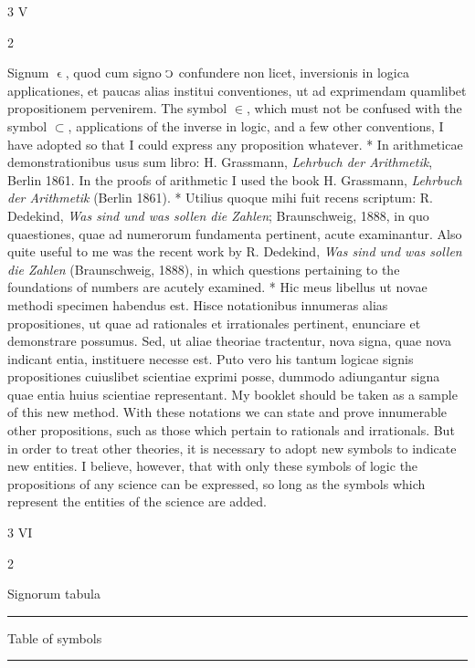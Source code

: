 \documentclass{book}
\newcommand{\s}{\switchcolumn} %
\newcommand{\C}{\mathop{\sbox0{$\displaystyle$$\reflectbox{C}$} %
\raisebox{-\height+\ht0-0.05cm}[\ht0][\dp0]{\scalebox{0.8}[0.8]{\copy0}}}\displaylimits} %
\newcommand{\smallIn}{\ensuremath{\mathrel{\epsilon}}}
\newcommand\peanoHeadingMedium[1]{ \vspace{1cm} {\Large #1} \nopagebreak[4]

  \noindent\rule{1cm}{0.4pt} \nopagebreak[1]}
\newcommand{\peanoPage}[1]{\vspace{1ex}

  \columnratio{0.475, 0.05, 0.475} \begin{paracol}{3} \centering \hdashrule{\columnwidth}{0.1mm}{0.1mm 1mm} \s #1 \s \hdashrule{\columnwidth}{0.1mm}{0.1mm 1mm} \end{paracol}

\vspace{1ex}}
\newenvironment{translateTwoCol}
               { %
                 \columnratio{0.5, 0.5} \begin{paracol}{2}
                 \newcommand{\LAT}{\switchcolumn[0]*}
                 \newcommand{\ENG}{\switchcolumn[1]}
               }
               { %
                 \let\ENG\undefined
                 \let\LAT\undefined
                 \end{paracol}
               }
\begin{document}
\peanoPage{V} %

\begin{translateTwoCol}
Signum $\smallIn$, quod cum signo $\C$ confundere non licet, inversionis in logica applicationes, et paucas alias institui conventiones, ut ad exprimendam quamlibet propositionem pervenirem.
\ENG
The symbol $\in$, which must not be confused with the symbol $\subset$, applications of the inverse in logic, and a few other conventions, I have adopted so that I could express any proposition whatever.
\LAT
In arithmeticae demonstrationibus usus sum libro: H. Grassmann, \emph{Lehrbuch der Arithmetik}, Berlin 1861.
\ENG
In the proofs of arithmetic I used the book H. Grassmann, \emph{Lehrbuch der Arithmetik} (Berlin 1861).
\LAT
Utilius quoque mihi fuit recens scriptum: R. Dedekind, \emph{Was sind und was sollen die Zahlen}; Braunschweig, 1888, in quo quaestiones, quae ad numerorum fundamenta pertinent, acute examinantur.
\ENG
Also quite useful to me was the recent work by R. Dedekind, \emph{Was sind und was sollen die Zahlen} (Braunschweig, 1888), in which questions pertaining to the foundations of numbers are acutely examined.
\LAT
Hic meus libellus ut novae methodi specimen habendus est. Hisce notationibus innumeras alias propositiones, ut quae ad rationales et irrationales pertinent, enunciare et demonstrare possumus. Sed, ut aliae theoriae tractentur, nova signa, quae nova indicant entia, instituere necesse est. Puto vero his tantum logicae signis propositiones cuiuslibet scientiae exprimi posse, dummodo adiungantur signa quae entia huius scientiae representant.
\ENG
My booklet should be taken as a sample of this new method. With these notations we can state and prove innumerable other propositions, such as those which pertain to rationals and irrationals. But in order to treat other theories, it is necessary to adopt new symbols to indicate new entities. I believe, however, that with only these symbols of logic the propositions of any science can be expressed, so long as the symbols which represent the entities of the science are added.
\end{translateTwoCol}

\peanoPage{VI} %

\begin{translateTwoCol}
\centering
{}
{}
\peanoHeadingMedium{Signorum tabula}
\ENG
\peanoHeadingMedium{Table of symbols}
\end{translateTwoCol}
\end{document}
